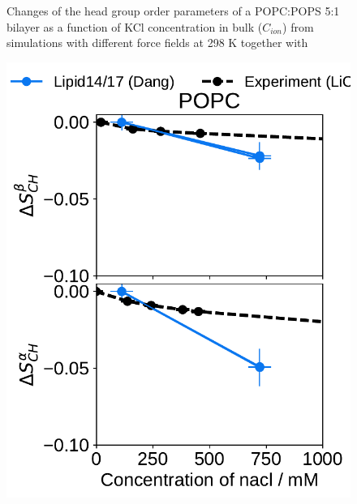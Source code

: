\documentclass[journal=jpcbfk,manuscript=article]{achemso}
\newlength{\figwidth}
\begin{document}
\begin{figure}[htb!]
  \caption{\label{fig:delta_ordPar_KCl} 
    Changes of the head group order parameters of a POPC:POPS 5:1 bilayer as a function of KCl concentration 
    in bulk ($C_{ion}$) from simulations with different force fields at 298 K together with  
  } 
\end{figure} 
 
 
\begin{figure}[htb!] 
  \centering 
  \includegraphics[width=\figwidth]{../Fig/l17/order_parameters_changes_A-B_POPC_nacl.pdf} 

\end{figure}
\end{document}
